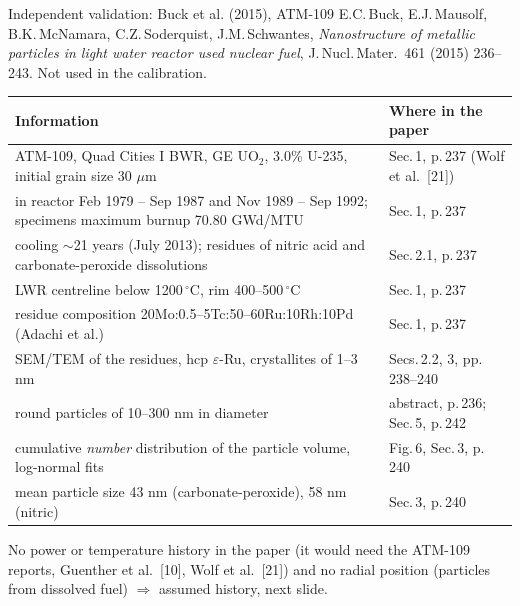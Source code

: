 \documentclass[aspectratio=169,10pt]{beamer}
\newcommand{\NEW}[1]{\textcolor{new}{#1}}
\begin{document}
\begin{frame}{Independent validation: Buck et al. (2015), ATM-109}
  \small
  E.C.\,Buck, E.J.\,Mausolf, B.K.\,McNamara, C.Z.\,Soderquist, J.M.\,Schwantes, \emph{Nanostructure of metallic particles in light
  water reactor used nuclear fuel}, J.\,Nucl.\,Mater.\ 461 (2015) 236--243. \NEW{Not used in the calibration.}
  \smallskip

  \scriptsize
  \renewcommand{\arraystretch}{1.05}
  \begin{tabular}{@{}p{}p{}@{}}
    \toprule
    Information & Where in the paper \\
    \midrule
    ATM-109, Quad Cities I BWR, GE UO$_2$, 3.0\% U-235, initial grain size 30 $\mu$m & Sec.\,1, p.\,237 (Wolf et al.\ [21]) \\
    in reactor Feb 1979 -- Sep 1987 and Nov 1989 -- Sep 1992; specimens maximum burnup 70.80 GWd/MTU & Sec.\,1, p.\,237 \\
    cooling $\sim$21 years (July 2013); residues of nitric acid and carbonate-peroxide dissolutions & Sec.\,2.1, p.\,237 \\
    LWR centreline below 1200\,$^\circ$C, rim 400--500\,$^\circ$C & Sec.\,1, p.\,237 \\
    residue composition 20Mo:0.5--5Tc:50--60Ru:10Rh:10Pd (Adachi et al.) & Sec.\,1, p.\,237 \\
    SEM/TEM of the residues, hcp $\varepsilon$-Ru, crystallites of 1--3 nm & Secs.\,2.2, 3, pp.\,238--240 \\
    round particles of 10--300 nm in diameter & abstract, p.\,236; Sec.\,5, p.\,242 \\
    cumulative \emph{number} distribution of the particle volume, log-normal fits & Fig.\,6, Sec.\,3, p.\,240 \\
    mean particle size 43 nm (carbonate-peroxide), 58 nm (nitric) & Sec.\,3, p.\,240 \\
    \bottomrule
  \end{tabular}
  \par\medskip
  \footnotesize No power or temperature history in the paper (it would need the ATM-109 reports, Guenther et al.\ [10], Wolf et al.\ [21])
  and no radial position (particles from dissolved fuel) $\Rightarrow$ \NEW{assumed history, next slide.}
\end{frame}
\end{document}
